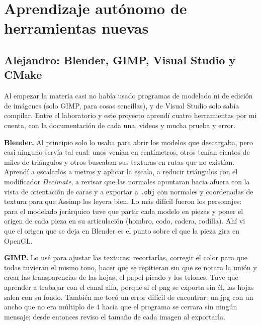 \documentclass[11pt,a4paper]{article}
\begin{document}

\section{Aprendizaje autónomo de herramientas nuevas}

\subsection{Alejandro: Blender, GIMP, Visual Studio y CMake}

Al empezar la materia casi no había usado programas de modelado ni de edición de imágenes (solo GIMP, para cosas sencillas), y de Visual Studio solo sabía compilar. Entre el laboratorio y este proyecto aprendí cuatro herramientas por mi cuenta, con la documentación de cada una, videos y mucha prueba y error.

\textbf{Blender.} Al principio solo lo usaba para abrir los modelos que descargaba, pero casi ninguno servía tal cual: unos venían en centímetros, otros tenían cientos de miles de triángulos y otros buscaban sus texturas en rutas que no existían. Aprendí a escalarlos a metros y aplicar la escala, a reducir triángulos con el modificador \textit{Decimate}, a revisar que las normales apuntaran hacia afuera con la vista de orientación de caras y a exportar a \texttt{.obj} con normales y coordenadas de textura para que Assimp los leyera bien. Lo más difícil fueron los personajes: para el modelado jerárquico tuve que partir cada modelo en piezas y poner el origen de cada pieza en su articulación (hombro, codo, cadera, rodilla). Ahí vi que el origen que se deja en Blender es el punto sobre el que la pieza gira en OpenGL.

\textbf{GIMP.} Lo usé para ajustar las texturas: recortarlas, corregir el color para que todas tuvieran el mismo tono, hacer que se repitieran sin que se notara la unión y crear las transparencias de las hojas, el papel picado y los telones. Tuve que aprender a trabajar con el canal alfa, porque si el png se exporta sin él, las hojas salen con su fondo. También me tocó un error difícil de encontrar: un jpg con un ancho que no era múltiplo de 4 hacía que el programa se cerrara sin ningún mensaje; desde entonces reviso el tamaño de cada imagen al exportarla.
\end{document}
